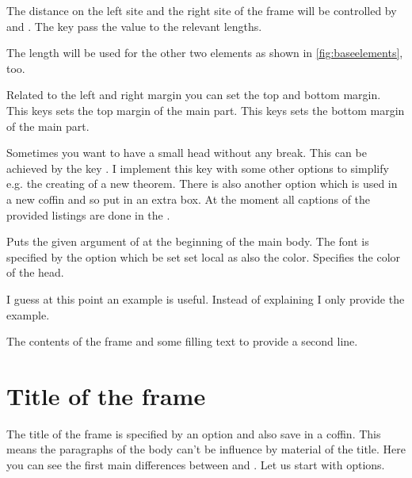 \documentclass[openany,12pt,tocdepth=3]{ltx-md}
\begin{document}
The distance on the left site and the right site of the frame will be 
controlled by  and . The 
key  pass the value to the relevant lengths. 

\begin{Note}
The length will be used for the other two elements as shown in 
\autoref{fig:baseelements}, too.
\end{Note}

 Related to the left and right margin you can set the top and bottom margin.
This keys sets the top margin of the main part.
This keys sets the bottom margin of the main part.


Sometimes you want to have a small head without any break. This
can be achieved by the key . I implement this key with 
some other options to simplify e.g. the creating of a new theorem. There
is also another option  which is used in a new coffin and
so put in an extra box. At the moment all captions of the provided listings
are done in the . 


Puts the given argument of  at the beginning
of the main body.
The font is specified by the option  which be set set local as
also the color.
Specifies the color of the head.


I guess at this point an example is useful. Instead of explaining I 
only provide the example.

\begin{ltxexample}[caption={Example main part},label=main,result=true]
 \begin{xframed}[%
   line-width=4pt,line-color=blue,
   inner-margin=1cm,font-color=blue!70,
   head={Example of Head},head-font-color={red!70},
   margin=1.5cm,bg-color=yellow!20,
  ]
   The contents of the frame and some filling text to 
  provide a second line.
 \end{xframed}
\end{ltxexample}


\section{Title of the frame}\label{sec:element-firsttitle}
The title of the frame is specified by an option and also save in a coffin. 
This means the paragraphs of the body can't be influence by material
of the title. Here you can see the first main differences between
 and . Let us start with options.
\end{document}

